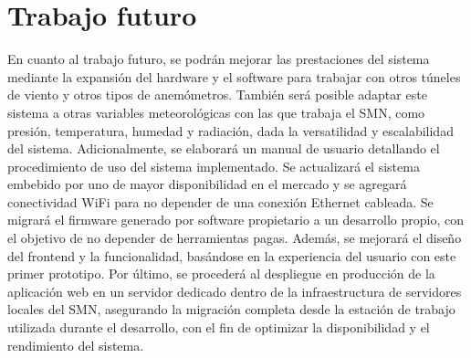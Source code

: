 \section{Trabajo futuro}

En cuanto al trabajo futuro, se podrán mejorar las prestaciones del sistema mediante la expansión del hardware y el software para trabajar con otros túneles de viento y otros tipos de anemómetros. También será posible adaptar este sistema a otras variables meteorológicas con las que trabaja el SMN, como presión, temperatura, humedad y radiación, dada la versatilidad y escalabilidad del sistema. Adicionalmente, se elaborará un manual de usuario detallando el procedimiento de uso del sistema implementado. Se actualizará el sistema embebido por uno de mayor disponibilidad en el mercado y se agregará conectividad WiFi para no depender de una conexión Ethernet cableada. Se migrará el firmware generado por software propietario a un desarrollo propio, con el objetivo de no depender de herramientas pagas. Además, se mejorará el diseño del frontend y la funcionalidad, basándose en la experiencia del usuario con este primer prototipo. Por último, se procederá al despliegue en producción de la aplicación web en un servidor dedicado dentro de la infraestructura de servidores locales del SMN, asegurando la migración completa desde la estación de trabajo utilizada durante el desarrollo, con el fin de optimizar la disponibilidad y el rendimiento del sistema.
